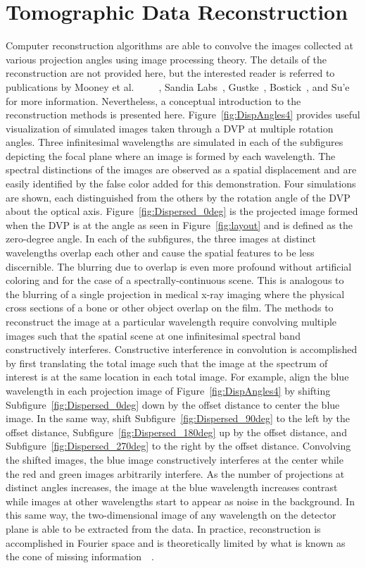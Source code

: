 \section{Tomographic Data Reconstruction}
Computer reconstruction algorithms are able to convolve the images collected at various projection angles using image processing theory. The details of the reconstruction are not provided here, but the interested reader is referred to publications by Mooney et al.~\cite{Mooney95}~\cite{Mooney97}~\cite{Mooney98}~\cite{Mooney99}~\cite{Mooney00}, Sandia Labs~\cite{Sandia05}, Gustke~\cite{Gustke}, Bostick~\cite{Bostick}, and Su'e~\cite{Sue} for more information. Nevertheless, a conceptual introduction to the reconstruction methods is presented here. Figure~\ref{fig:DispAngles4} provides useful visualization of simulated images taken through a \ac{DVP} at multiple rotation angles. Three infinitesimal wavelengths are simulated in each of the subfigures depicting the focal plane where an image is formed by each wavelength. The spectral distinctions of the images are observed as a spatial displacement and are easily identified by the false color added for this demonstration. Four simulations are shown, each distinguished from the others by the rotation angle of the \ac{DVP} about the optical axis. Figure~\ref{fig:Dispersed_0deg} is the projected image formed when the \ac{DVP} is at the angle as seen in Figure~\ref{fig:layout} and is defined as the zero-degree angle. In each of the subfigures, the three images at distinct wavelengths overlap each other and cause the spatial features to be less discernible. The blurring due to overlap is even more profound without artificial coloring and for the case of a spectrally-continuous scene. This is analogous to the blurring of a single projection in medical x-ray imaging where the physical cross sections of a bone or other object overlap on the film. The methods to reconstruct the image at a particular wavelength require convolving multiple images such that the spatial scene at one infinitesimal spectral band constructively interferes. Constructive interference in convolution is accomplished by first translating the total image such that the image at the spectrum of interest is at the same location in each total image. For example, align the blue wavelength in each projection image of Figure~\ref{fig:DispAngles4} by shifting Subfigure~\ref{fig:Dispersed_0deg} down by the offset distance to center the blue image. In the same way, shift Subfigure~\ref{fig:Dispersed_90deg} to the left by the offset distance, Subfigure~\ref{fig:Dispersed_180deg} up by the offset distance, and Subfigure~\ref{fig:Dispersed_270deg} to the right by the offset distance. Convolving the shifted images, the blue image constructively interferes at the center while the red and green images arbitrarily interfere. As the number of projections at distinct angles increases, the image at the blue wavelength increases contrast while images at other wavelengths start to appear as noise in the background. In this same way, the two-dimensional image of any wavelength on the detector plane is able to be extracted from the data. In practice, reconstruction is accomplished in Fourier space and is theoretically limited by what is known as the cone of missing information~\cite{MissingCone}~\cite{Mooney00}.

